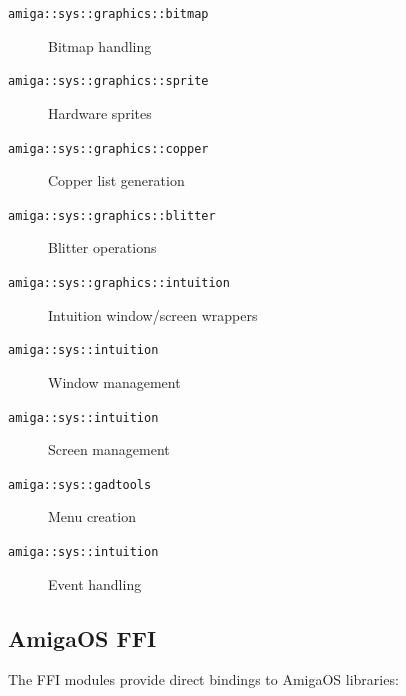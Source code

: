 \begin{description}
    \item[\texttt{amiga::sys::graphics::bitmap}] Bitmap handling
    \item[\texttt{amiga::sys::graphics::sprite}] Hardware sprites
    \item[\texttt{amiga::sys::graphics::copper}] Copper list generation
    \item[\texttt{amiga::sys::graphics::blitter}] Blitter operations
    \item[\texttt{amiga::sys::graphics::intuition}] Intuition window/screen wrappers
    \item[\texttt{amiga::sys::intuition}] Window management
    \item[\texttt{amiga::sys::intuition}] Screen management
    \item[\texttt{amiga::sys::gadtools}] Menu creation
    \item[\texttt{amiga::sys::intuition}] Event handling
\end{description}

\subsection{AmigaOS FFI}
\label{subsec:ffi-modules}

The FFI modules provide direct bindings to AmigaOS libraries:

